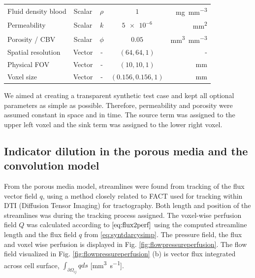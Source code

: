 \documentclass[paper=a4, fontsize=11pt,parskip=half,headings=small]{scrartcl}
\newcommand{\Perf}{Q}
\newcommand{\simu}{k\pascal\second}
\newcommand{\siFmm}{\milli\meter\cubed\per\second}
\begin{document}
\begin{table}[H]
\begin{tabular}{ l  c  c c  r }
			Fluid density blood \cite{kenner89} 			& Scalar & $\rho$ 			& $\num{1}$				& \si{\milli\gram\per\cubic\milli\meter} 		\\
			Permeability  							&	Scalar	& $k$ 				& $\num{5e-6}$ 			& \si{\square\milli\meter} 			\\
			Porosity / CBV	\cite{Smith00}						&	Scalar	& $\phi$ 			& $0.05$ 				& \si{\cubic\milli\meter\per\cubic\milli\meter}	\\
			Spatial resolution 						&	Vector	& - 				& $(64,64,1)$ 			& -					\\
			Physical FOV 							&	Vector & - 				& $(10,10,1)$ 			& \si{\milli\meter}				\\
			Voxel size 							&	Vector	& - 				& $(0.156,0.156,1)$ 	& \si{\milli\meter}	\\
	  \end{tabular}
	  \label{tab:par}
	\end{table}	
	
	We aimed at creating a transparent synthetic test case and kept all optional parameters as simple as possible. 
	Therefore, permeability and porosity were assumed constant in space and in time. The source term was assigned to the upper left voxel and the sink term was assigned to the lower right voxel. 
	
	\subsection{Indicator dilution in the porous media and the convolution model}


From the porous media model, streamlines were found from tracking of the flux vector field $q$, using a method closely related to FACT \cite{Mori1998} used for tracking within DTI (Diffusion Tensor Imaging) for tractography. Both length and position of the streamlines was during the tracking process assigned. The voxel-wise perfusion field $\Perf$ was calculated according to $\eqref{eq:flux2perf}$ using the computed streamline length and the flux field $q$ from \eqref{eq:syntdarcysimp}. The pressure field, the flux and voxel wise perfusion is displayed in Fig. \ref{fig:flowpressureperfusion}. The flow field visualized in  Fig. \ref{fig:flowpressureperfusion} (b) is vector flux integrated across cell surface, $\int_{\partial \Omega_{ij}}q ds$ [\si{\siFmm}].
\end{document}

